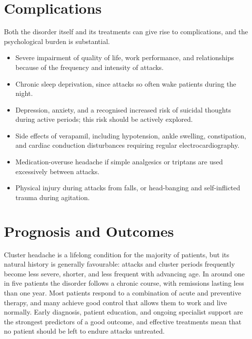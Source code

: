 \section*{Complications}
Both the disorder itself and its treatments can give rise to complications, and the psychological burden is substantial.
\begin{itemize}
    \item Severe impairment of quality of life, work performance, and relationships because of the frequency and intensity of attacks.
    \item Chronic sleep deprivation, since attacks so often wake patients during the night.
    \item Depression, anxiety, and a recognised increased risk of suicidal thoughts during active periods; this risk should be actively explored.
    \item Side effects of verapamil, including hypotension, ankle swelling, constipation, and cardiac conduction disturbances requiring regular electrocardiography.
    \item Medication-overuse headache if simple analgesics or triptans are used excessively between attacks.
    \item Physical injury during attacks from falls, or head-banging and self-inflicted trauma during agitation.
\end{itemize}

\section*{Prognosis and Outcomes}
Cluster headache is a lifelong condition for the majority of patients, but its natural history is generally favourable: attacks and cluster periods frequently become less severe, shorter, and less frequent with advancing age. In around one in five patients the disorder follows a chronic course, with remissions lasting less than one year. Most patients respond to a combination of acute and preventive therapy, and many achieve good control that allows them to work and live normally. Early diagnosis, patient education, and ongoing specialist support are the strongest predictors of a good outcome, and effective treatments mean that no patient should be left to endure attacks untreated.


